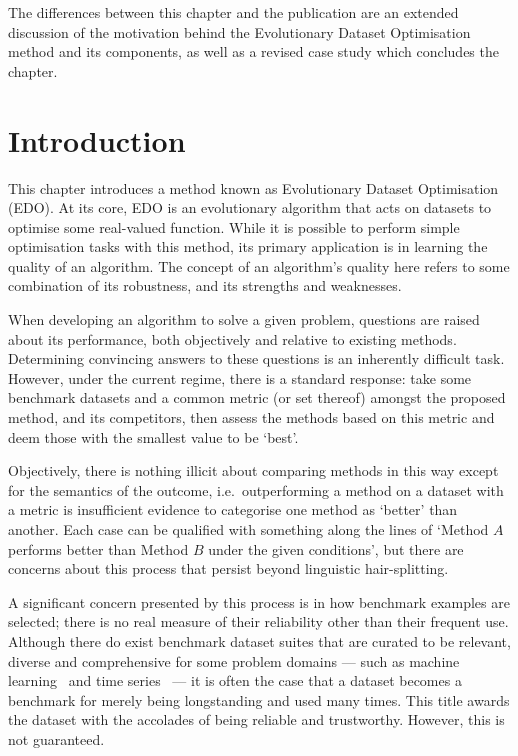 \myrule%

The differences between this chapter and the publication are an extended
discussion of the motivation behind the Evolutionary Dataset Optimisation method
and its components, as well as a revised case study which concludes the chapter.


\section{Introduction}\label{section:introduction}

This chapter introduces a method known as Evolutionary Dataset Optimisation
(EDO). At its core, EDO is an evolutionary algorithm that acts on datasets to
optimise some real-valued function. While it is possible to perform simple
optimisation tasks with this method, its primary application is in learning the
quality of an algorithm. The concept of an algorithm's quality here refers to
some combination of its robustness, and its strengths and weaknesses.

When developing an algorithm to solve a given problem, questions are raised
about its performance, both objectively and relative to existing methods.
Determining convincing answers to these questions is an inherently difficult
task. However, under the current regime, there is a standard response: take some
benchmark datasets and a common metric (or set thereof) amongst the proposed
method, and its competitors, then assess the methods based on this metric and
deem those with the smallest value to be `best'.

Objectively, there is nothing illicit about comparing methods in this way except
for the semantics of the outcome, i.e.\ outperforming a method on a dataset with
a metric is insufficient evidence to categorise one method as `better' than
another. Each case can be qualified with something along the lines of `Method
\(A\) performs better than Method \(B\) under the given conditions', but there
are concerns about this process that persist beyond linguistic hair-splitting. 

A significant concern presented by this process is in how benchmark examples are
selected; there is no real measure of their reliability other than their
frequent use. Although there do exist benchmark dataset suites that are curated
to be relevant, diverse and comprehensive for some problem domains --- such as
machine learning~\cite{Dua2019,Olson2017} and time series~\cite{UCRArchive2018}
--- it is often the case that a dataset becomes a benchmark for merely being
longstanding and used many times. This title awards the dataset with the
accolades of being reliable and trustworthy. However, this is not guaranteed.

